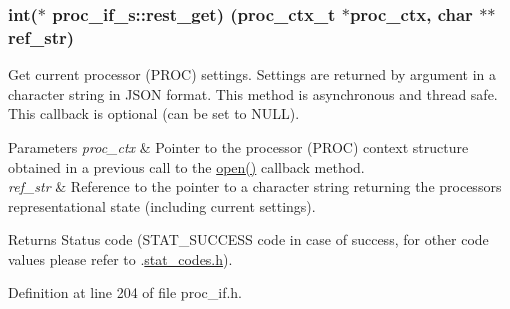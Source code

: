 \subsubsection[{\texorpdfstring{rest\+\_\+get}{rest_get}}]{\setlength{\rightskip}{0pt plus 5cm}int($\ast$ proc\+\_\+if\+\_\+s\+::rest\+\_\+get) ({\bf proc\+\_\+ctx\+\_\+t} $\ast$proc\+\_\+ctx, char $\ast$$\ast$ref\+\_\+str)}\hypertarget{structproc__if__s_afd94617c2897f8b3bcbd28d90bdf0ca1}{}\label{structproc__if__s_afd94617c2897f8b3bcbd28d90bdf0ca1}
Get current processor (P\+R\+OC) settings. Settings are returned by argument in a character string in J\+S\+ON format. This method is asynchronous and thread safe. This callback is optional (can be set to N\+U\+LL). 
\begin{DoxyParams}{Parameters}
{\em proc\+\_\+ctx} & Pointer to the processor (P\+R\+OC) context structure obtained in a previous call to the \textquotesingle{}\hyperlink{structproc__if__s_a34999576771394dfb721463c8455ba06}{open()}\textquotesingle{} callback method. \\
\hline
{\em ref\+\_\+str} & Reference to the pointer to a character string returning the processor\textquotesingle{}s representational state (including current settings). \\
\hline
\end{DoxyParams}
\begin{DoxyReturn}{Returns}
Status code (S\+T\+A\+T\+\_\+\+S\+U\+C\+C\+E\+SS code in case of success, for other code values please refer to .\hyperlink{stat__codes_8h}{stat\+\_\+codes.\+h}). 
\end{DoxyReturn}


Definition at line 204 of file proc\+\_\+if.\+h.

